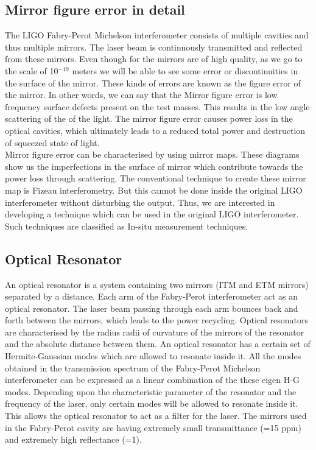 \documentclass[colorlinks=true,pdfstartview=FitV,linkcolor=blue,
            citecolor=red,urlcolor=magenta]{ligodoc}
\begin{document}
\subsection{Mirror figure error in detail}
The LIGO Fabry-Perot Michelson interferometer consists of multiple cavities and thus multiple mirrors. The laser beam is continuously transmitted and reflected from these mirrors. Even though for the mirrors are of high quality, as we go to the scale of 10$^{-19}$ meters we will be able to see some error or discontinuities in the surface of the mirror. These kinds of errors are known as the figure error of the mirror. In other words, we can say that the Mirror figure error is  low frequency surface defects present on the test masses. This results in the low angle scattering of the of the light. The mirror figure error causes power loss in the optical cavities, which ultimately leads to a reduced total power and destruction of squeezed state of light.
\vspace{5mm}
\\Mirror figure error can be characterised by using mirror maps. These diagrams show us the imperfections in the surface of mirror which contribute towards the power loss through scattering. The conventional technique to create these mirror map is Fizeau interferometry. But this cannot be done inside the original LIGO interferometer without disturbing the output. Thus, we are interested in developing a technique which can be used in the original LIGO interferometer. Such techniques are classified as In-situ measurement techniques. 

\subsection{Optical Resonator}
An optical resonator is a system containing two mirrors (ITM and ETM mirrors) separated by a distance. Each arm of the Fabry-Perot interferometer act as an optical resonator. The laser beam passing through each arm bounces back and forth between the mirrors, which leads to the power recycling. Optical resonators are characterised by the radius radii of curvature of the mirrors of the resonator and the absolute distance between them. An optical resonator has a certain set of Hermite-Gaussian modes which are allowed to resonate inside it. All the modes obtained in the transmission spectrum of the Fabry-Perot Michelson interferometer can be expressed as a linear combination of the these eigen H-G modes. Depending upon the characteristic parameter of the resonator and the frequency of the laser, only certain modes will be allowed to resonate inside it. This allows the optical resonator to act as a filter for the laser. The mirrors used in the Fabry-Perot cavity are having extremely small transmittance (=15 ppm) and extremely high reflectance (=1).
\end{document}
